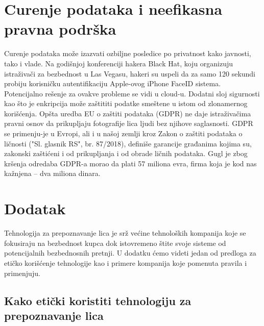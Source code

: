 \documentclass{article}
\begin{document}
\newpage

\section{Curenje podataka i neefikasna pravna podrška}

Curenje podataka može izazvati ozbiljne posledice po privatnost kako javnosti, tako i vlade.
\newline
\newline
Na godišnjoj konferenciji hakera Black Hat, koju organizuju istraživači za bezbednost u Las Vegasu, hakeri su uspeli da za samo 120 sekundi probiju korisničku autentifikaciju Apple-ovog iPhone FaceID sistema. Potencijalno rešenje za ovakve probleme se vidi u cloud-u. Dodatni sloj sigurnosti kao što je enkripcija može zaštititi podatke smeštene u istom od zlonamernog korišćenja. \cite{sedma}
\newline
\newline
Opšta uredba EU o zaštiti podataka (GDPR) ne daje istraživačima pravni osnov da prikupljaju fotografije lica ljudi bez njihove saglasnosti. GDPR se primenju-je u Evropi, ali i u našoj zemlji kroz Zakon o zaštiti podataka o ličnosti ("Sl. glasnik RS", br. 87/2018), definiše garancije građanima kojima su, zakonski zaštićeni i od prikupljanja i od obrade ličnih podataka. Gugl je zbog kršenja odredaba GDPR-a morao da plati 57 miliona evra, firma koja je kod nas kažnjena – dva miliona dinara. \cite{osma}

\newpage

\section{Dodatak }

Tehnologija za prepoznavanje lica je srž većine tehnoloških kompanija koje se fokusiraju na bezbednost kupca dok istovremeno štite svoje sisteme od potencijalnih bezbednosnih pretnji. U dodatku ćemo videti jedan od predloga za etičko korišćenje tehnologije kao i primere kompanija koje pomenuta pravila i primenjuju. \cite{sedma}


\subsection{Kako etički koristiti tehnologiju za prepoznavanje lica}
\end{document}
